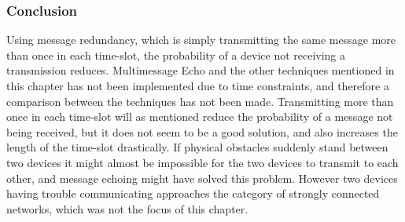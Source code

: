 \subsubsection{Conclusion}
\vspace{-7pt}
Using message redundancy, which is simply transmitting the same message more than once in each time-slot, the probability of a device not receiving a transmission reduces.
Multimessage Echo and the other techniques mentioned in this chapter has not been implemented due to time constraints, and therefore a comparison between the techniques has not been made.
Transmitting more than once in each time-slot will as mentioned reduce the probability of a message not being received, but it does not seem to be a good solution, and also increases the length of the time-slot drastically.
If physical obstacles suddenly stand between two devices it might almost be impossible for the two devices to transmit to each other, and message echoing might have solved this problem.
However two devices having trouble communicating approaches the category of strongly connected networks, which was not the focus of this chapter.